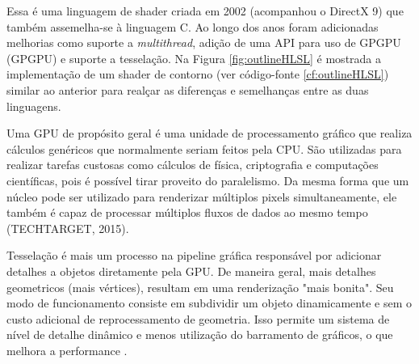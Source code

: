 Essa é uma linguagem de shader criada em 2002 (acompanhou o DirectX 9) que também assemelha-se à linguagem C. Ao longo dos anos foram adicionadas melhorias como suporte a \textit{\Gls{multithread}}, adição de uma API para uso de GPGPU (\acrlong{GPGPU}) e suporte a tesselação. Na Figura \ref{fig:outlineHLSL} é mostrada a implementação de um shader de contorno (ver código-fonte \ref{cf:outlineHLSL}) similar ao anterior para realçar as diferenças e semelhanças entre as duas linguagens.

Uma GPU de propósito geral é uma unidade de processamento gráfico que realiza cálculos genéricos que normalmente seriam feitos pela CPU. São utilizadas para realizar tarefas custosas como cálculos de física, criptografia e computações científicas, pois é possível tirar proveito do paralelismo. Da mesma forma que um núcleo pode ser utilizado para renderizar múltiplos pixels simultaneamente, ele também é capaz de processar múltiplos fluxos de dados ao mesmo tempo (TECHTARGET, 2015)\nocite{GPGPU}.

Tesselação é mais um processo na pipeline gráfica responsável por adicionar detalhes a objetos diretamente pela GPU. De maneira geral, mais detalhes geometricos (mais vértices), resultam em uma renderização "mais bonita". Seu modo de funcionamento consiste em subdividir um objeto dinamicamente e sem o custo adicional de reprocessamento de geometria. Isso permite um sistema de nível de detalhe dinâmico e menos utilização do barramento de gráficos, o que melhora a performance \cite{HLSLBook}.

	\begin{figure}[h!]
		\centering
	\end{figure}
	\nocite{tesselation}

